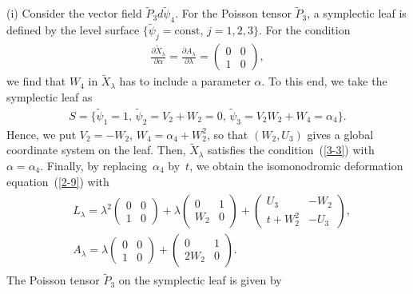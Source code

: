 \documentclass[pdftex]{sigma}
\numberwithin{equation}{section}
\begin{document}
(i) Consider the vector f\/ield $\widetilde{P}_3 d\widetilde{\psi}_4$. For the Poisson tensor $\widetilde{P}_3$, a symplectic leaf is def\/ined by the level surface $\{ \widetilde{\psi}_j = \text{const},\, j=1,2,3\}$. For the condition
\begin{gather}
\frac{\partial \widetilde{X}_\lambda }{\partial \alpha } = \frac{\partial A_\lambda }{\partial \lambda } = \left(
\begin{matrix}
0 & 0 \\
1 & 0
\end{matrix}
\right),
\label{3-3}
\end{gather}
we  f\/ind that $W_4$ in $\widetilde{X}_\lambda $ has to include a parameter $\alpha $. To this end, we take the symplectic leaf as
\begin{gather*}
S = \big\{ \widetilde{\psi}_1 = 1,\, \widetilde{\psi}_2 = V_2 + W_2 = 0 ,\, \widetilde{\psi}_3 = V_2W_2 + W_4 = \alpha _4 \big\}.
\end{gather*}
Hence, we put $V_2 = -W_2$, $W_4 = \alpha _4 + W_2^2$, so that $(W_2, U_3)$ gives a global coordinate system on the leaf. Then, $\widetilde{X}_\lambda $ satisf\/ies the condition~(\ref{3-3}) with $\alpha =\alpha _4$. Finally, by replacing~$\alpha _4$ by~$t$, we obtain the isomonodromic deformation equation~(\ref{2-9}) with
\begin{gather*}
\begin{split}
& L_\lambda = \lambda ^2 \left(
\begin{matrix}
0 & 0 \\
1 & 0
\end{matrix}
\right) + \lambda \left(
\begin{matrix}
0 & 1 \\
W_2 & 0
\end{matrix}
\right) + \left(
\begin{matrix}
U_3 & -W_2 \\
t + W_2^2 & -U_3
\end{matrix}
\right), \\
& A_\lambda = \lambda \left(
\begin{matrix}
0 & 0 \\
1 & 0
\end{matrix}
\right) + \left(
\begin{matrix}
0 & 1 \\
2W_2 & 0
\end{matrix}
\right) .
\end{split}
\end{gather*}
The Poisson tensor $\widetilde{P}_3$ on the symplectic leaf is given by
\end{document}
